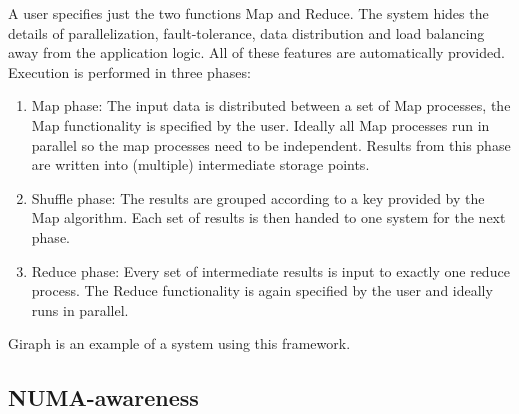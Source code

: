 A user specifies just the two functions Map and Reduce.
The system hides the details of parallelization, fault-tolerance, data distribution and load balancing away from the application logic.
All of these features are automatically provided.
Execution is performed in three phases:
\begin{enumerate}
	\item Map phase: The input data is distributed between a set of Map processes, the Map functionality is specified by the user. Ideally all Map processes run in parallel so the map processes need to be independent. Results from this phase are written into (multiple) intermediate storage points.
	\item Shuffle phase: The results are grouped according to a key provided by the Map algorithm. Each set of results is then handed to one system for the next phase.
	\item Reduce phase: Every set of intermediate results is input to exactly one reduce process. The Reduce functionality is again specified by the user and ideally runs in parallel.
\end{enumerate}
Giraph \cite{Giraph} is an example of a system using this framework.

\subsection{NUMA-awareness}
